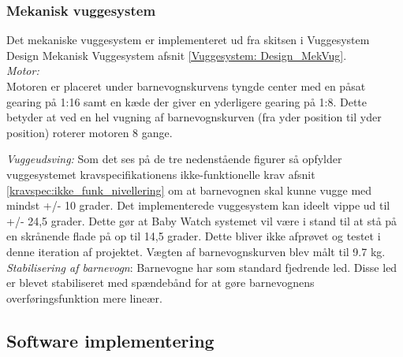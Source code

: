 \subsubsection{Mekanisk vuggesystem}
\label{Vuggesystem: Implementering_MV} 
Det mekaniske vuggesystem er implementeret ud fra skitsen i Vuggesystem Design Mekanisk Vuggesystem afsnit \vref{Vuggesystem: Design_MekVug}. \\
\textit{Motor:}\\
Motoren er placeret under barnevognskurvens tyngde center med en påsat gearing på 1:16 samt en kæde der giver en yderligere gearing på 1:8. Dette betyder at ved en hel vugning af barnevognskurven (fra yder position til yder position) roterer motoren 8 gange.

\textit{Vuggeudsving:}
Som det ses på de tre nedenstående figurer så opfylder vuggesystemet kravspecifikationens ikke-funktionelle krav afsnit \ref{kravspec:ikke_funk_nivellering} om at barnevognen skal kunne vugge med mindst +/- 10 grader. Det implementerede vuggesystem  kan ideelt vippe ud til +/- 24,5 grader. Dette gør at Baby Watch systemet vil være i stand til at stå på en skrånende flade på op til 14,5 grader. Dette bliver ikke afprøvet og testet i denne iteration af projektet. Vægten af barnevognskurven blev målt til 9.7 kg.
\textit{Stabilisering af barnevogn}:
Barnevogne har som standard fjedrende led. Disse led er blevet stabiliseret med spændebånd for at gøre barnevognens overføringsfunktion mere lineær. 

\newpage
\subsection{Software implementering}
